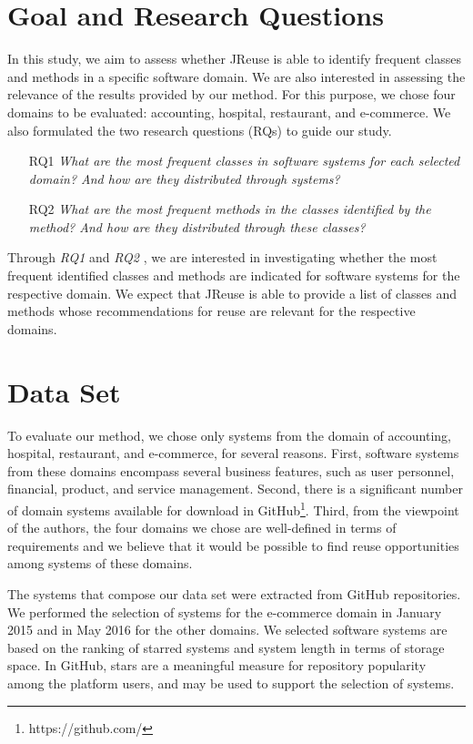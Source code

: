 \section{Goal and Research Questions}
\label{ch4sec:rq}

 

In this study, we aim to assess whether JReuse is able to identify frequent classes and methods in a specific software domain. We are also interested  in assessing the relevance of the results provided by our method. For this purpose, we chose four domains to be evaluated: accounting, hospital, restaurant, and e-commerce. We also formulated the two  research questions (RQs) to guide our study.

\begin{itemize}
	\item[RQ1] \textit{What are the most frequent classes in  software systems for each selected domain? And how are they distributed through systems?}
	\item[RQ2] \textit{What are the most frequent methods in the  classes identified by the method? And how are they distributed through these classes?}
\end{itemize}

Through \textit{RQ1} and \textit{RQ2} , we are interested in investigating whether the most frequent identified classes and methods  are indicated for software systems for the respective domain. We expect that JReuse is able to provide a list of classes and methods whose recommendations for reuse are relevant for the respective domains.



\section{Data Set}
\label{ch4sec:dataSet}

To evaluate our method, we chose only systems from the domain of accounting, hospital, restaurant, and e-commerce, for  several reasons. First, software systems from these domains encompass several business features, such as user personnel, financial, product, and service management. Second, there is a significant number of domain systems available  for download  in GitHub\footnote{https://github.com/}. Third, from the viewpoint of the authors, the four domains we chose are well-defined in terms of requirements and we believe that it would be possible to find reuse opportunities among systems of these domains.

The systems that compose our data set were extracted from GitHub repositories. We performed the selection of systems for the e-commerce domain in January 2015 and in May 2016 for the other domains. We selected software systems are based on the ranking of starred systems and system length in terms of storage space. In GitHub, stars are a meaningful measure for repository popularity among the platform users, and may be used to support the selection of systems.


